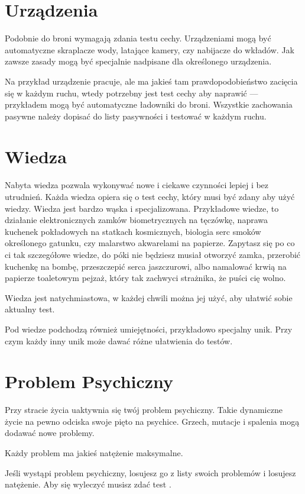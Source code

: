 \section{Urządzenia}
Podobnie do broni wymagają zdania testu cechy.
Urządzeniami mogą być automatyczne skraplacze wody, latające kamery, czy nabijacze do wkładów.
Jak zawsze zasady mogą być specjalnie nadpisane dla określonego urządzenia.

Na przykład urządzenie pracuje, ale ma jakieś tam prawdopodobieństwo zacięcia się w każdym ruchu, wtedy potrzebny jest test cechy aby naprawić --- przykładem mogą być automatyczne ładowniki do broni.
Wszystkie zachowania pasywne należy dopisać do listy pasywności i testować w każdym ruchu.

\section{Wiedza}
Nabyta wiedza pozwala wykonywać nowe i ciekawe czynności lepiej i bez utrudnień.
Każda wiedza opiera się o test cechy, który musi być zdany aby użyć wiedzy.
Wiedza jest bardzo wąska i specjalizowana.
Przykładowe wiedze, to działanie elektronicznych zamków biometrycznych na tęczówkę, naprawa kuchenek pokładowych na statkach kosmicznych, biologia serc smoków określonego gatunku, czy malarstwo akwarelami na papierze.
Zapytasz się po co ci tak szczegółowe wiedze, do póki nie będziesz musiał otworzyć zamka, przerobić kuchenkę na bombę, przeszczepić serca jaszczurowi, albo namalować krwią na papierze toaletowym pejzaż, który tak zachwyci strażnika, że puści cię wolno.

Wiedza jest natychmiastowa, w każdej chwili można jej użyć, aby ułatwić sobie aktualny test.

Pod wiedze podchodzą również umiejętności, przykładowo specjalny unik.
Przy czym każdy inny unik może dawać różne ułatwienia do testów.

\section{Problem Psychiczny}
Przy stracie życia uaktywnia się twój problem psychiczny.
Takie dynamiczne życie na pewno odciska swoje pięto na psychice. 
Grzech, mutacje i spalenia mogą dodawać nowe problemy.

Każdy problem ma jakieś natężenie maksymalne.

Jeśli wystąpi problem psychiczny, losujesz go z listy swoich problemów i losujesz natężenie.
Aby się wyleczyć musisz zdać test \abh{}.

